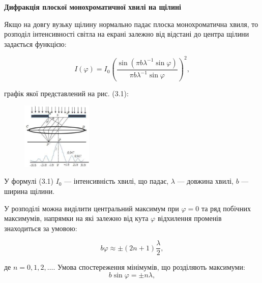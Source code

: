 \documentclass[12pt,a4paper]{article}
\begin{document}
    \begin{center} \textbf{Дифракція плоскої монохроматичної хвилі на щілині} \end{center}

    Якщо на довгу вузьку щілину нормально падає плоска монохроматична хвиля, то розподіл інтенсивності світла на екрані залежно від відстані до центра
    щілини задається функцією:

    \begin{equation}
        I(\varphi) = I_0 \left( \frac{\sin(\pi b \lambda^{-1} \sin \varphi)}{\pi b \lambda^{-1} \sin \varphi} \right)^2,
        \tag{3.1}
    \end{equation}

    графік якої представлений на рис. (3.1):

    \begin{figure}[!ht]

        \renewcommand{\thefigure}{3.\arabic{figure}} %

        \centering
        \includegraphics[width=0.3\textwidth]{3.1.png}
        \caption{}
        \label{fig1:schema}

    \end{figure}

    У формулі (3.1) $I_0$ --- інтенсивність хвилі, що падає, $\lambda$ --- довжина хвилі, $b$ --- ширина щілини.

    У розподілі можна виділити центральний максимум при $\varphi = 0$ та ряд побічних максимумів, напрямки на які залежно від кута $\varphi$ відхилення
    променів знаходиться за умовою:

    \begin{equation}
        b\varphi \approx \pm \left( 2n + 1 \right) \frac{\lambda}{2},
        \tag{3.2}
    \end{equation}

    де $n = 0, 1, 2, \dots$.
    Умова спостереження мінімумів, що розділяють максимуми:
    \[
    b\sin \varphi = \pm n \lambda,
    \]
\end{document}
